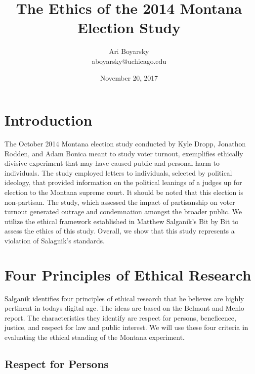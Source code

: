 \documentclass[12pt]{article}
\begin{document}

\title{The Ethics of the 2014 Montana Election Study}
\author{Ari Boyarsky \\ aboyarsky@uchicago.edu}
\date{November 20, 2017}



\maketitle


\section{Introduction}

The October 2014 Montana election study conducted by Kyle Dropp, Jonathon Rodden, and Adam Bonica meant to study voter turnout, exemplifies ethically divisive experiment that may have caused public and personal harm to individuals. The study employed letters to individuals, selected by political ideology, that provided information on the political leanings of a judges up for election to the Montana supreme court. It should be noted that this election is non-partisan. The study, which assessed the impact of partisanship on voter turnout generated outrage and condemnation amongst the broader public. We utilize the ethical framework established in Matthew Salganik’s Bit by Bit to assess the ethics of this study. Overall, we show that this study represents a violation of Salagnik’s standards.  

\section{Four Principles of Ethical Research}

Salganik identifies four principles of ethical research that he believes are highly pertinent in todays digital age. The ideas are based on the Belmont and Menlo report. The characteristics they identify are respect for persons, beneficence, justice, and respect for law and public interest. We will use these four criteria in evaluating the ethical standing of the Montana experiment. 

\subsection{Respect for Persons}
\end{document}
